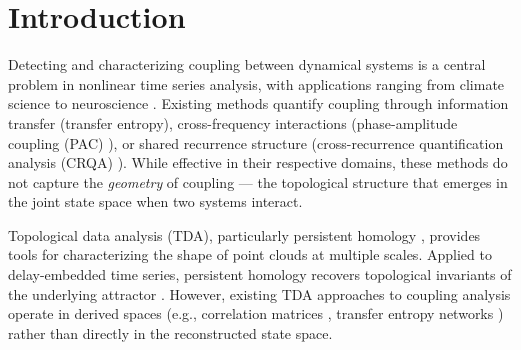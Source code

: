 \documentclass[11pt,a4paper]{article}
\begin{document}
\begin{abstract}
(x) cardiac arrhythmia detection on MIT-BIH ECG \citep{moody2001impact} using mixed topological and signal features (mean AUROC $= 0.8014$, leave-one-record-out CV over 5 records), demonstrating cross-domain applicability beyond EEG;
(xi) the first direct experimental confirmation of the K\"unneth cross-term prediction \citep{hatcher2002algebraic}: on a reservoir computing system where spectral radius drift drives synchronization, inverted binding (alarm on binding score \emph{decrease}) detects degradation onset at $\text{F1} = 0.984$, confirming that binding measures topological independence rather than coupling strength;
and (xii) perfect perceptual switch detection ($\text{F1} = 1.0$) via an adaptive per-subject strategy that combines alpha power for dense-switching subjects with windowed TDA for sparse cases, closing the recall gap from 40.6\% to 100\%.
The method is implemented in the open-source \texttt{att-toolkit} Python package.
\end{abstract}

\section{Introduction}

Detecting and characterizing coupling between dynamical systems is a central problem in nonlinear time series analysis, with applications ranging from climate science \citep{schreiber2000measuring} to neuroscience \citep{fries2005mechanism}.
Existing methods quantify coupling through information transfer (transfer entropy), cross-frequency interactions (phase-amplitude coupling (PAC) \citep{tort2010measuring}), or shared recurrence structure (cross-recurrence quantification analysis (CRQA) \citep{marwan2007recurrence}).
While effective in their respective domains, these methods do not capture the \emph{geometry} of coupling --- the topological structure that emerges in the joint state space when two systems interact.

Topological data analysis (TDA), particularly persistent homology \citep{carlsson2009topology, edelsbrunner2010computational}, provides tools for characterizing the shape of point clouds at multiple scales.
Applied to delay-embedded time series, persistent homology recovers topological invariants of the underlying attractor \citep{perea2015sliding}.
However, existing TDA approaches to coupling analysis operate in derived spaces (e.g., correlation matrices \citep{giusti2015clique}, transfer entropy networks \citep{xi2023directed}) rather than directly in the reconstructed state space.
\end{document}
